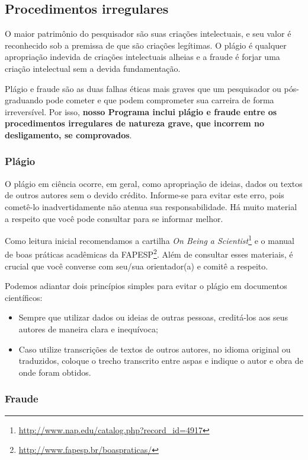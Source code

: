 \subsection{Procedimentos irregulares}

O maior patrimônio do pesquisador são suas criações intelectuais, e
seu valor é reconhecido sob a premissa de que são criações
legítimas. O plágio é qualquer apropriação indevida de criações
intelectuais alheias e a fraude é forjar uma criação intelectual sem a
devida fundamentação.

Plágio e fraude são as duas falhas éticas mais graves que um
pesquisador ou pós-graduando pode cometer e que podem comprometer sua
carreira de forma irreversível. Por isso, \textbf{nosso Programa
  inclui plágio e fraude entre os procedimentos irregulares de
  natureza grave, que incorrem no desligamento, se comprovados}.

\subsubsection{Plágio}
O plágio em ciência ocorre, em geral, como apropriação de ideias,
dados ou textos de outros autores sem o devido crédito. Informe-se
para evitar este erro, pois cometê-lo inadvertidamente não atenua sua
responsabilidade. Há muito material a respeito que você pode consultar
para se informar melhor.

Como leitura inicial recomendamos a cartilha \emph{On Being a
  Scientist}\footnote{\url{http://www.nap.edu/catalog.php?record_id=4917}}
e o manual de boas práticas acadêmicas da
FAPESP\footnote{\url{http://www.fapesp.br/boaspraticas/}}. Além de
consultar esses materiais, é crucial que você converse com seu/sua
orientador(a) e comitê a respeito.

Podemos adiantar dois princípios simples para evitar o plágio em documentos científicos:

\begin{itemize}
\item Sempre que utilizar dados ou ideias de outras pessoas,
  creditá-los aos seus autores de maneira clara e inequívoca;
\item Caso utilize transcrições de textos de outros autores, no idioma
  original ou traduzidos, coloque o trecho transcrito entre aspas e
  indique o autor e obra de onde foram obtidos.
\end{itemize}


\subsubsection{Fraude}
\label{sec:fraude}

